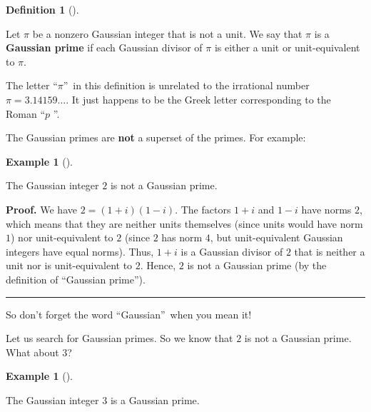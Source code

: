 \documentclass[numbers=enddot,12pt,final,onecolumn,notitlepage]{scrartcl}%
\numberwithin{exer}{subsection}
\theoremstyle{definition}
\newtheorem{defi}[theo]{Definition}
\newenvironment{definition}[1][]
{\begin{defi}[#1]\begin{leftbar}}
{\end{leftbar}\end{defi}}
\newtheorem{exam}[theo]{Example}
\newenvironment{example}[1][]
{\begin{exam}[#1]\begin{leftbar}}
{\end{leftbar}\end{exam}}
\newenvironment{proof}[1][Proof]{\noindent\textbf{#1.} }{\ \rule{0.5em}{0.5em}}
\begin{document}
\begin{definition}
\label{def.Z[i].gauss.prime}Let $\pi$ be a nonzero Gaussian integer that is
not a unit. We say that $\pi$ is a \textbf{Gaussian prime} if each Gaussian
divisor of $\pi$ is either a unit or unit-equivalent to $\pi$.
\end{definition}

The letter \textquotedblleft$\pi$\textquotedblright\ in this definition is
unrelated to the irrational number $\pi=3.14159\ldots$. It just happens to be
the Greek letter corresponding to the Roman \textquotedblleft$p$%
\textquotedblright.

The Gaussian primes are \textbf{not} a superset of the primes. For example:

\begin{example}
\label{exa.Z[i].gauss.2notprime}The Gaussian integer $2$ is not a Gaussian prime.
\end{example}

\begin{proof}
We have $2=\left(  1+i\right)  \left(  1-i\right)  $. The factors $1+i$ and
$1-i$ have norms $2$, which means that they are neither units themselves
(since units would have norm $1$) nor unit-equivalent to $2$ (since $2$ has
norm $4$, but unit-equivalent Gaussian integers have equal norms). Thus, $1+i$
is a Gaussian divisor of $2$ that is neither a unit nor is unit-equivalent to
$2$. Hence, $2$ is not a Gaussian prime (by the definition of
\textquotedblleft Gaussian prime\textquotedblright).
\end{proof}

So don't forget the word \textquotedblleft Gaussian\textquotedblright\ when
you mean it!

Let us search for Gaussian primes. So we know that $2$ is not a Gaussian
prime. What about $3$?

\begin{example}
The Gaussian integer $3$ is a Gaussian prime.
\end{example}
\end{document}

